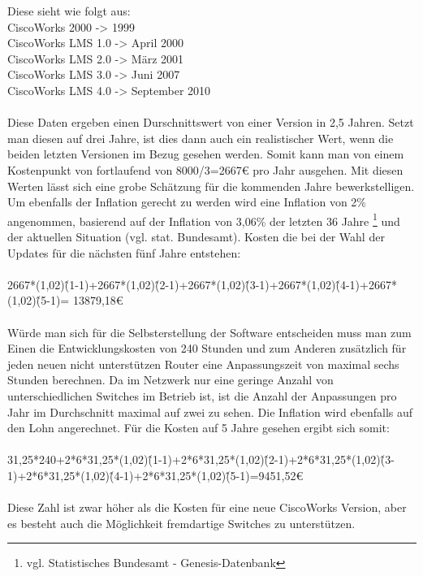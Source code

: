 Diese sieht wie folgt aus:
\\
CiscoWorks 2000 -> 1999\\
CiscoWorks LMS 1.0 -> April 2000\\
CiscoWorks LMS 2.0 -> März 2001 \\
CiscoWorks LMS 3.0 -> Juni 2007\\
CiscoWorks LMS 4.0 -> September 2010\\
\\
Diese Daten ergeben einen Durschnittswert von einer Version in 2,5 Jahren.
Setzt man diesen auf drei Jahre, ist dies dann auch ein realistischer Wert, wenn die beiden letzten Versionen im Bezug gesehen werden. Somit kann man von einem Kostenpunkt von fortlaufend von 8000/3=2667€ pro Jahr ausgehen. Mit diesen Werten lässt sich eine grobe Schätzung für die kommenden Jahre bewerkstelligen.
Um ebenfalls der Inflation gerecht zu werden wird eine Inflation von 2\% angenommen, basierend auf der Inflation von 3,06\% der letzten 36 Jahre \footnote{vgl. Statistisches Bundesamt - Genesis-Datenbank} und der aktuellen Situation (vgl. stat. Bundesamt).
Kosten die bei der Wahl der Updates für die nächsten fünf Jahre entstehen:\\
\\
2667*(1,02)\^(1-1)+2667*(1,02)\^(2-1)+2667*(1,02)\^(3-1)+2667*(1,02)\^(4-1)+2667*(1,02)\^(5-1)=
13879,18€\\
\\
Würde man sich für die Selbsterstellung der Software entscheiden muss man zum Einen die Entwicklungskosten von 240 Stunden und zum Anderen zusätzlich für jeden neuen nicht unterstützen Router eine Anpassungszeit von maximal sechs Stunden berechnen.
Da im Netzwerk nur eine geringe Anzahl von unterschiedlichen Switches im Betrieb ist, ist die Anzahl der Anpassungen pro Jahr im Durchschnitt maximal auf zwei zu sehen.
Die Inflation wird ebenfalls auf den Lohn angerechnet. Für die Kosten auf 5 Jahre gesehen ergibt sich somit:\\
\\
31,25*240+2*6*31,25*(1,02)\^(1-1)+2*6*31,25*(1,02)\^(2-1)+2*6*31,25*(1,02)\^(3-1)+2*6*31,25*(1,02)\^(4-1)+2*6*31,25*(1,02)\^(5-1)=9451,52€\\
\\
Diese Zahl ist zwar höher als die Kosten für eine neue CiscoWorks Version, aber es besteht auch die Möglichkeit fremdartige Switches zu unterstützen.
